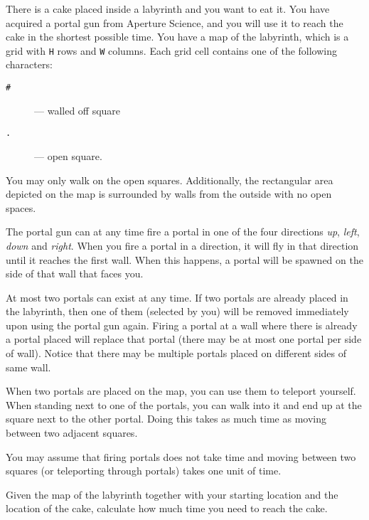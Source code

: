 \documentclass{../../../latex/boi2014}
\newcommand{\param}[1]{{\tt #1}}
\newcommand{\constant}[1]{{\tt #1}}
\begin{document}
    There is a cake placed inside a labyrinth and you want
    to eat it. You have acquired a portal gun from
    Aperture Science\texttrademark, and you will use it to reach
    the cake in the shortest possible time. You
    have a map of the labyrinth, which is a grid with \param{H}
    rows and \param{W} columns. Each grid cell contains one
    of the following characters:

    \begin{description}
        \item[\constant{\#}] --- walled off square
        \item[\constant{.}] --- open square.
    \end{description}

    You may only walk on the open squares. Additionally, the rectangular
    area depicted on the map is surrounded by walls from the outside
    with no open spaces.

    The portal gun can at any time fire a portal in one of the four
    directions \emph{up}, \emph{left}, \emph{down} and \emph{right}.
    When you fire a portal in a direction, it will fly in that direction
    until it reaches the first wall. When this happens, a portal
    will be spawned on the side of that wall that faces you.

    At most two portals can exist at any time. If two portals
    are already placed in the labyrinth, then one of them (selected
    by you) will be removed immediately upon using the portal gun
    again. Firing a portal at a wall where there is already a portal
    placed will replace that portal (there may be at most one portal
    per side of wall). Notice that there may be multiple portals placed
    on different sides of same wall.


    When two portals are placed on the map, you can use them to
    teleport yourself. When standing next to one of the portals,
    you can walk into it and end up at the square next to the other
    portal. Doing this takes as much time as moving between two
    adjacent squares.

    You may assume that firing portals does not take time and moving
    between two squares (or teleporting through portals) takes one unit
    of time.

    \Task

    Given the map of the labyrinth together with your starting location
    and the location of the cake, calculate how much time you need to
    reach the cake.
\end{document}
